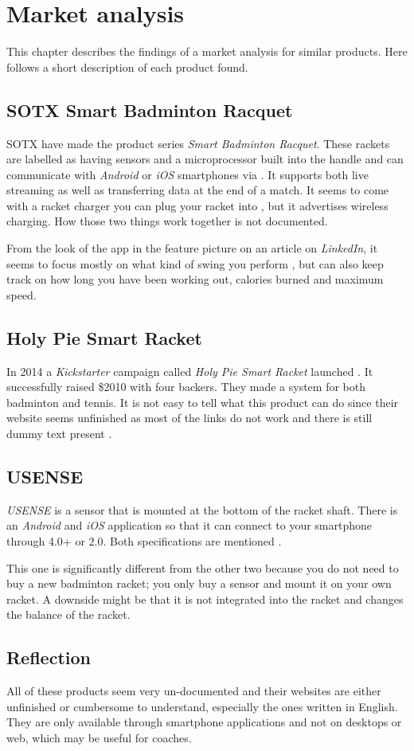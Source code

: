 \chapter{Market analysis}
This chapter describes the findings of a market analysis for similar products. 
Here follows a short description of each product found.

\section*{SOTX Smart Badminton Racquet}
SOTX have made the product series \textit{Smart Badminton Racquet}. 
These rackets are labelled as having sensors and a microprocessor built into the handle and can communicate with \textit{Android} or \textit{iOS} smartphones via   \citep{marketAnalysis:sotxsite}. 
It supports both live streaming as well as transferring data at the end of a match. 
It seems to come with a racket charger you can plug your racket into \citep{marketAnalysis:sotxhw}, but it advertises wireless charging. 
How those two things work together is not documented.

From the look of the app in the feature picture on an article on \textit{LinkedIn}, it seems to focus mostly on what kind of swing you perform \citep{marketAnalysis:sotxapp}, but can also keep track on how long you have been working out, calories burned and maximum speed.

\section*{Holy Pie Smart Racket}
In 2014 a \textit{Kickstarter} campaign called \textit{Holy Pie Smart Racket} launched \citep{marketAnalysis:holypie}. 
It successfully raised \$2010 with four backers. 
They made a system for both badminton and tennis. 
It is not easy to tell what this product can do since their website seems unfinished as most of the links do not work and there is still dummy text present \citep{marketAnalysis:holypi}.

\section*{USENSE}
\textit{USENSE} is a sensor that is mounted at the bottom of the racket shaft. 
There is an \textit{Android} and \textit{iOS} application so that it can connect to your smartphone through  4.0+ or 2.0. 
Both specifications are mentioned \citep{marketAnalysis:usense}.
 
This one is significantly different from the other two because you do not need to buy a new badminton racket; you only buy a sensor and mount it on your own racket. 
A downside might be that it is not integrated into the racket and changes the balance of the racket.

\section*{Reflection}
All of these products seem very un-documented and their websites are either unfinished or cumbersome to understand, especially the ones written in English. 
They are only available through smartphone applications and not on desktops or web, which may be useful for coaches.
